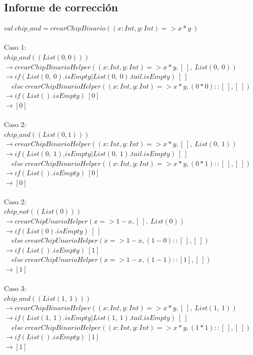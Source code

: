 \documentclass[12pt, a4paper]{article}
\begin{document}
\subsection{Informe de corrección}
$val~chip\_and = crearChipBinario((x: Int, y: Int) => x*y~)$ \\ \\
Caso 1: \\ 
$chip\_and((List(0, 0)))$ \\
$\rightarrow crearChipBinarioHelper((x: Int, y: Int) => x*y, [~], ~List(0,~0))$ \\
$\rightarrow if ( List(0,~0).isEmpty | List(0, ~0).tail.isEmpty)~[~] $ \\
$~~~~~else~crearChipBinarioHelper((x: Int, y: Int) => x*y,  (0*0)::[~], [~])$ \\
$\rightarrow if (List().isEmpty)~[0] $ \\
$\rightarrow [0]$ \\ \\
Caso 2: \\ 
$chip\_and((List(0, 1)))$ \\
$\rightarrow crearChipBinarioHelper((x: Int, y: Int) => x*y, [~], ~List(0,~1))$ \\
$\rightarrow if ( List(0,~1).isEmpty | List(0, ~1).tail.isEmpty)~[~] $ \\
$~~~~~else~crearChipBinarioHelper((x: Int, y: Int) => x*y,  (0*1)::[~], [~])$ \\
$\rightarrow if (List().isEmpty)~[0] $ \\
$\rightarrow [0]$ \\ \\
Caso 2: \\ 
$chip\_not((List(0)))$ \\
$\rightarrow crearChipUnarioHelper(x => 1 - x, [~], ~List(0))$ \\
$\rightarrow if (List(0).isEmpty)~[~] $ \\
$~~~~~else~crearChipUnarioHelper(x => 1 - x, (1 - 0)::[~], [~])$ \\
$\rightarrow if (List().isEmpty)~[1] $ \\
$~~~~~else~crearChipUnarioHelper(x => 1 - x, (1 - 1)::[1], [~])$ \\
$\rightarrow [1]$ \\ \\
Caso 3: \\ 
$chip\_and((List(1,~1)))$ \\
$\rightarrow crearChipBinarioHelper((x: Int, y: Int) => x*y, [~], ~List(1,~1))$ \\
$\rightarrow if ( List(1,~1).isEmpty | List(1, ~1).tail.isEmpty)~[~] $ \\
$~~~~~else~crearChipBinarioHelper((x: Int, y: Int) => x*y,  (1*1)::[~], [~])$ \\
$\rightarrow if (List().isEmpty)~[1] $ \\
$\rightarrow [1]$ \\ \\
\end{document}
